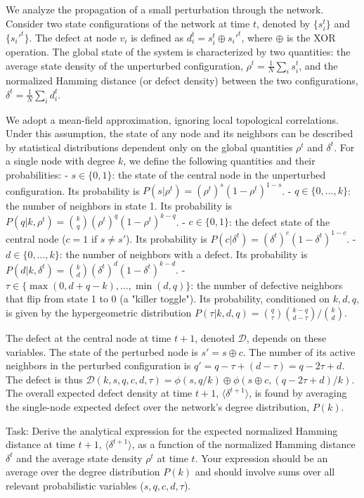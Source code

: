 \documentclass[10pt]{article}
\begin{document}
We analyze the propagation of a small perturbation through the network. Consider two state configurations of the network at time $t$, denoted by $\{s_i^t\}$ and $\{s_i'^t\}$. The defect at node $v_i$ is defined as $d_i^t = s_i^t \oplus s_i'^t$, where $\oplus$ is the XOR operation. The global state of the system is characterized by two quantities: the average state density of the unperturbed configuration, $\rho^t = \frac{1}{N}\sum_i s_i^t$, and the normalized Hamming distance (or defect density) between the two configurations, $\delta^t = \frac{1}{N}\sum_i d_i^t$.

We adopt a mean-field approximation, ignoring local topological correlations. Under this assumption, the state of any node and its neighbors can be described by statistical distributions dependent only on the global quantities $\rho^t$ and $\delta^t$. For a single node with degree $k$, we define the following quantities and their probabilities:
- $s \in \{0,1\}$: the state of the central node in the unperturbed configuration. Its probability is $P(s|\rho^t) = (\rho^t)^s (1-\rho^t)^{1-s}$.
- $q \in \{0, \dots, k\}$: the number of neighbors in state 1. Its probability is $P(q|k,\rho^t) = \binom{k}{q} (\rho^t)^q (1-\rho^t)^{k-q}$.
- $c \in \{0,1\}$: the defect state of the central node ($c=1$ if $s \neq s'$). Its probability is $P(c|\delta^t) = (\delta^t)^c (1-\delta^t)^{1-c}$.
- $d \in \{0, \dots, k\}$: the number of neighbors with a defect. Its probability is $P(d|k,\delta^t) = \binom{k}{d}(\delta^t)^d (1-\delta^t)^{k-d}$.
- $\tau \in \{\max(0, d+q-k), \dots, \min(d,q)\}$: the number of defective neighbors that flip from state 1 to 0 (a "killer toggle"). Its probability, conditioned on $k, d, q$, is given by the hypergeometric distribution $P(\tau|k, d, q) = \binom{q}{\tau}\binom{k-q}{d-\tau} / \binom{k}{d}$.

The defect at the central node at time $t+1$, denoted $\mathcal{D}$, depends on these variables. The state of the perturbed node is $s' = s \oplus c$. The number of its active neighbors in the perturbed configuration is $q' = q - \tau + (d-\tau) = q - 2\tau + d$. The defect is thus $\mathcal{D}(k, s, q, c, d, \tau) = \phi(s, q/k) \oplus \phi(s\oplus c, (q-2\tau+d)/k)$. The overall expected defect density at time $t+1$, $\langle\delta^{t+1}\rangle$, is found by averaging the single-node expected defect over the network's degree distribution, $P(k)$.

Task:
Derive the analytical expression for the expected normalized Hamming distance at time $t+1$, $\langle\delta^{t+1}\rangle$, as a function of the normalized Hamming distance $\delta^t$ and the average state density $\rho^t$ at time $t$. Your expression should be an average over the degree distribution $P(k)$ and should involve sums over all relevant probabilistic variables ($s, q, c, d, \tau$).
\end{document}
